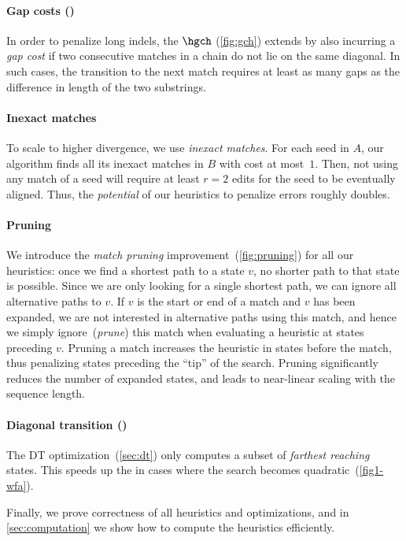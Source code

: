 \paragraph{Gap costs (\GCH)} In order to penalize long indels, the \gch $\hgch$
(\cref{fig:gch}) extends \csh by also incurring a \emph{gap cost} if two
consecutive matches in a chain do not lie on the same diagonal. In such cases,
the transition to the next match requires at least as many gaps as the
difference in length of the two substrings.

\paragraph{Inexact matches} To scale to higher divergence, we use
\emph{inexact matches}. For each seed in $A$, our algorithm finds all its inexact
matches in $B$ with cost at most~$1$. Then, not using any match of a seed will
require at least $r{=}2$ edits for the seed to be eventually aligned. Thus, the
\emph{potential} of our heuristics to penalize errors roughly doubles.

\paragraph{Pruning} We introduce the \emph{match pruning}
improvement~(\cref{fig:pruning}) for all our heuristics: once we find a shortest
path to a state $v$, no shorter path to that state is possible. Since we are
only looking for a single shortest path, we can ignore all alternative paths to
$v$. If $v$ is the start or end of a match and $v$ has been expanded, we are not
interested in alternative paths using this match, and hence we simply
ignore~(\emph{prune}) this match when evaluating a heuristic at states preceding
$v$. Pruning a match increases the heuristic in states before the match, thus
penalizing states preceding the ``tip'' of the \A search. Pruning significantly
reduces the number of expanded states, and leads to near-linear scaling with the
sequence length.

\paragraph{Diagonal transition (\DT)}
The DT optimization~(\cref{sec:dt}) only computes a subset of \emph{farthest
reaching} states. This speeds up the \A in cases where the search becomes
quadratic~(\cref{fig1-wfa}).

Finally, we prove correctness of all heuristics and optimizations, and
in \cref{sec:computation} we show how to compute the heuristics efficiently.
